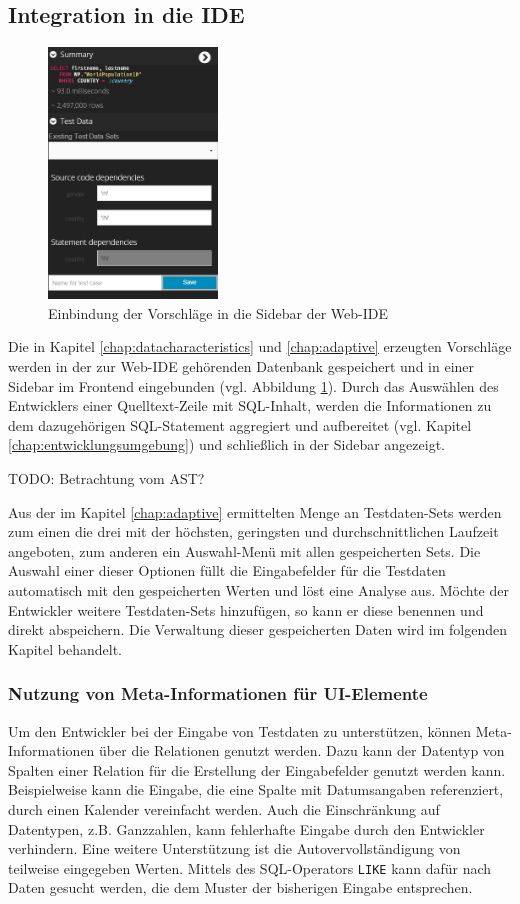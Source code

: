 \subsection{Integration in die IDE}
\begin{figure}[ht]
	\centering
  \includegraphics[width=0.4\textwidth]{figures/integration.png}
	\caption{Einbindung der Vorschläge in die Sidebar der Web-IDE}
	\label{fig:ideintegration}
\end{figure}

Die in Kapitel \ref{chap:datacharacteristics} und \ref{chap:adaptive} erzeugten Vorschläge werden in der zur Web-IDE gehörenden Datenbank gespeichert und in einer Sidebar im Frontend eingebunden (vgl. Abbildung \ref{fig:ideintegration}).
Durch das Auswählen des Entwicklers einer Quelltext-Zeile mit SQL-Inhalt, werden die Informationen zu dem dazugehörigen SQL-Statement aggregiert und aufbereitet (vgl. Kapitel \ref{chap:entwicklungsumgebung}) und schließlich in der Sidebar angezeigt.

TODO: Betrachtung vom AST?

Aus der im Kapitel \ref{chap:adaptive} ermittelten Menge an Testdaten-Sets werden zum einen die drei mit der höchsten, geringsten und durchschnittlichen Laufzeit angeboten, zum anderen ein Auswahl-Menü mit allen gespeicherten Sets.
Die Auswahl einer dieser Optionen füllt die Eingabefelder für die Testdaten automatisch mit den gespeicherten Werten und löst eine Analyse aus.
Möchte der Entwickler weitere Testdaten-Sets hinzufügen, so kann er diese benennen und direkt abspeichern.
Die Verwaltung dieser gespeicherten Daten wird im folgenden Kapitel behandelt.

\subsubsection{Nutzung von Meta-Informationen für UI-Elemente}
Um den Entwickler bei der Eingabe von Testdaten zu unterstützen, können Meta-Informationen über die Relationen genutzt werden.
Dazu kann der Datentyp von Spalten einer Relation für die Erstellung der Eingabefelder genutzt werden kann.
Beispielweise kann die Eingabe, die eine Spalte mit Datumsangaben referenziert, durch einen Kalender vereinfacht werden.
Auch die Einschränkung auf Datentypen, z.B. Ganzzahlen, kann fehlerhafte Eingabe durch den Entwickler verhindern.
Eine weitere Unterstützung ist die Autovervollständigung von teilweise eingegeben Werten.
Mittels des SQL-Operators \texttt{LIKE} kann dafür nach Daten gesucht werden, die dem Muster der bisherigen Eingabe entsprechen.